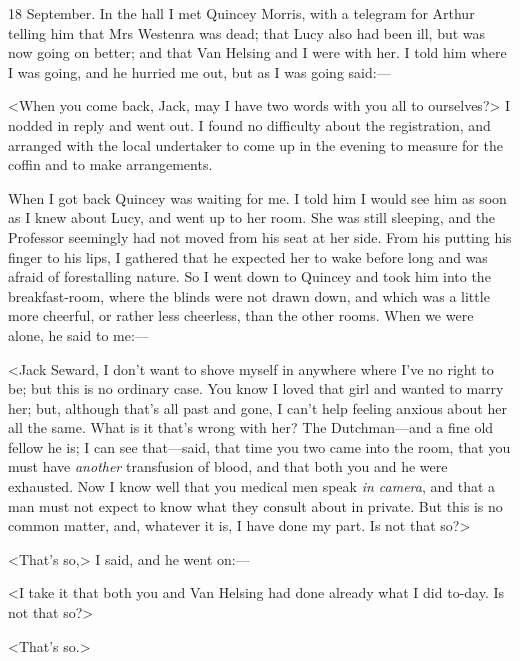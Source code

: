 \begin{diary}{18 September.}
In the hall I met Quincey Morris, with a telegram for Arthur telling him that Mrs Westenra was dead; that Lucy also had been ill, but was now going on better; and that Van Helsing and I were with her. I told him where I was going, and he hurried me out, but as I was going said:—

<When you come back, Jack, may I have two words with you all to ourselves?> I nodded in reply and went out. I found no difficulty about the registration, and arranged with the local undertaker to come up in the evening to measure for the coffin and to make arrangements.

When I got back Quincey was waiting for me. I told him I would see him as soon as I knew about Lucy, and went up to her room. She was still sleeping, and the Professor seemingly had not moved from his seat at her side. From his putting his finger to his lips, I gathered that he expected her to wake before long and was afraid of forestalling nature. So I went down to Quincey and took him into the breakfast-room, where the blinds were not drawn down, and which was a little more cheerful, or rather less cheerless, than the other rooms. When we were alone, he said to me:—

<Jack Seward, I don't want to shove myself in anywhere where I've no right to be; but this is no ordinary case. You know I loved that girl and wanted to marry her; but, although that's all past and gone, I can't help feeling anxious about her all the same. What is it that's wrong with her? The Dutchman—and a fine old fellow he is; I can see that—said, that time you two came into the room, that you must have \textit{another} transfusion of blood, and that both you and he were exhausted. Now I know well that you medical men speak \textit{in camera}, and that a man must not expect to know what they consult about in private. But this is no common matter, and, whatever it is, I have done my part. Is not that so?>

<That's so,> I said, and he went on:—

<I take it that both you and Van Helsing had done already what I did to-day. Is not that so?>

<That's so.>


\end{diary}
